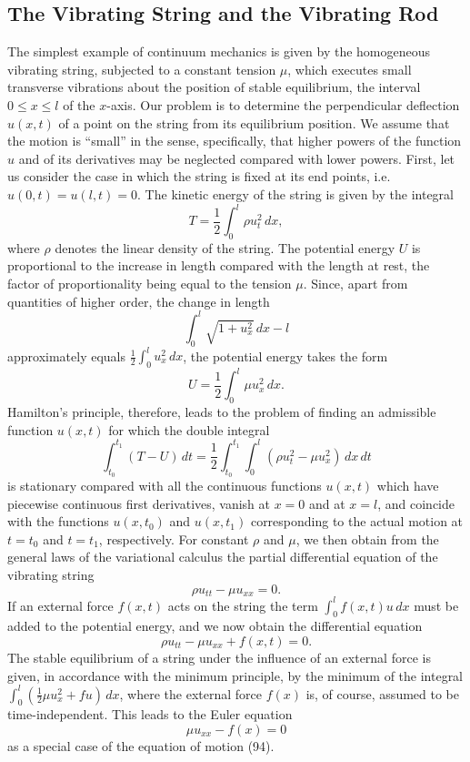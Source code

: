 \subsection{The Vibrating String and the Vibrating Rod}
The simplest example of continuum mechanics is given by the homogeneous vibrating string, subjected to a constant tension $\mu$, which executes small transverse vibrations about the position of stable equilibrium, the interval $0\le x\le l$ of the $x$-axis. Our problem is to determine the perpendicular deflection $u(x,t)$ of a point on the string from its equilibrium position. We assume that the motion is ``small'' in the sense, specifically, that higher powers of the function $u$ and of its derivatives may be neglected compared with lower powers. First, let us consider the case in which the string is fixed at its end points, i.e. $u(0,t)=u(l,t)=0$. The kinetic energy of the string is given by the integral
\[
T=\frac12\int_0^l\rho u_t^2\,dx,
\]
where $\rho$ denotes the linear density of the string. The potential energy $U$ is proportional to the increase in length compared with the length at rest, the factor of proportionality being equal to the tension $\mu$. Since, apart from quantities of higher order, the change in length
\[
\int_0^l\sqrt{1+u_x^2}\,dx-l
\]
approximately equals $\frac12\int_0^l u_x^2\,dx$, the potential energy takes the form
\[
U=\frac12\int_0^l\mu u_x^2\,dx.
\]
Hamilton's principle, therefore, leads to the problem of finding an admissible function $u(x,t)$ for which the double integral
\[
\int_{t_0}^{t_1}(T-U)\,dt
=\frac12\int_{t_0}^{t_1}\int_0^l(\rho u_t^2-\mu u_x^2)\,dx\,dt
\]
is stationary compared with all the continuous functions $u(x,t)$ which have piecewise continuous first derivatives, vanish at $x=0$ and at $x=l$, and coincide with the functions $u(x,t_0)$ and $u(x,t_1)$ corresponding to the actual motion at $t=t_0$ and $t=t_1$, respectively. For constant $\rho$ and $\mu$, we then obtain from the general laws of the variational calculus the partial differential equation of the vibrating string
\begin{equation}\tag{93}
\rho u_{tt}-\mu u_{xx}=0.
\end{equation}
If an external force $f(x,t)$ acts on the string the term $\int_0^l f(x,t)u\,dx$ must be added to the potential energy, and we now obtain the differential equation
\begin{equation}\tag{94}
\rho u_{tt}-\mu u_{xx}+f(x,t)=0.
\end{equation}
The stable equilibrium of a string under the influence of an external force is given, in accordance with the minimum principle, by the minimum of the integral $\int_0^l(\frac12\mu u_x^2+fu)\,dx$, where the external force $f(x)$ is, of course, assumed to be time-independent. This leads to the Euler equation
\[
\mu u_{xx}-f(x)=0
\]
as a special case of the equation of motion (94).


